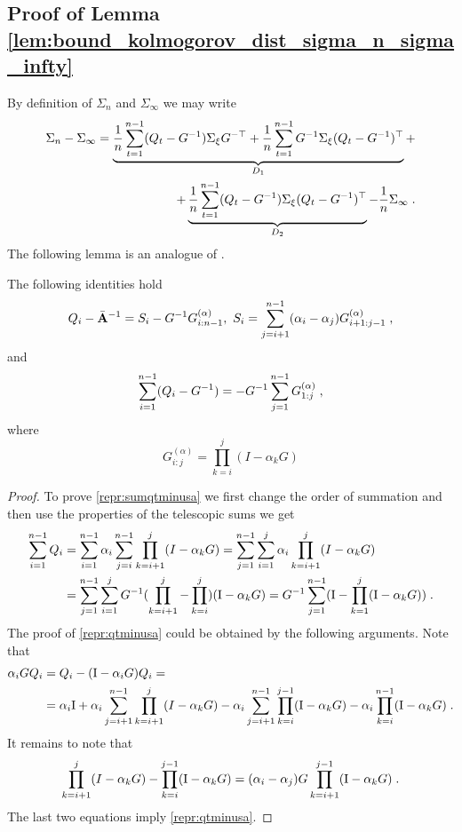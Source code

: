 \subsection{Proof of Lemma \ref{lem:bound_kolmogorov_dist_sigma_n_sigma_infty}}
\label{sec: proof of difference between cov}
By definition of $\Sigma_n$ and $\Sigma_\infty$ we may write
\begin{align}
    \label{repr:Lstar_minus_Ln}
    \Sigma_n - \Sigma_{\infty} = \underbrace{\frac{1}{n}\sum_{t=1}^{n-1} (Q_t - G^{-1})\Sigma_\xi G^{-\top} + \frac{1}{n} \sum_{t=1}^{n-1} G^{-1} \Sigma_\xi (Q_t - G^{-1})^\top}_{D_1} + \\ + \underbrace{\frac{1}{n} \sum_{t=1}^{n-1} (Q_t - G^{-1}) \Sigma_\xi (Q_t - G^{-1})^{\top}}_{D_2} - \frac{1}{n} \Sigma_{\infty} \;. 
\end{align}
The following lemma is an analogue of \citep[pp. 26-30]{wu2024statistical}. 

\begin{lemma} The following identities hold
\begin{equation}
    \label{repr:qtminusa}
    Q_i - \bar{\mathbf{A}}^{-1} = S_i - G^{-1} G_{i:n-1}^{(\alpha)} ,~ S_i = \sum_{j=i+1}^{n-1} (\alpha_i - \alpha_j) G_{i+1:j-1}^{(\alpha)} \;,  
\end{equation}
and
\begin{equation}
    \label{repr:sumqtminusa}
    \sum_{i=1}^{n-1} (Q_i - G^{-1}) = -G^{-1} \sum_{j=1}^{n-1} G_{1:j}^{(\alpha)} \;,
\end{equation}
where 
\begin{equation}
     G_{i:j}^{(\alpha)} = \prod_{k=i}^{j}(I-\alpha_kG)
\end{equation}
\end{lemma}

 \begin{proof}
To prove \eqref{repr:sumqtminusa} we first change the order of summation and then use the  properties of the telescopic sums we get
\begin{align}
\sum_{i=1}^{n-1} Q_i &= \sum_{i=1}^{n-1} \alpha_i \sum_{j=i}^{n-1}\prod_{k=i+1}^{j}(I-\alpha_k G) = \sum_{j=1}^{n-1} \sum_{i = 1}^j \alpha_i \prod_{k=i+1}^{j}(I-\alpha_k G) \\
& = \sum_{j=1}^{n-1} \sum_{i = 1}^j G^{-1} (\prod_{k = i+1}^{j} -  \prod_{k = i}^{j}) (\mathrm{I} - \alpha_k G)  = G^{-1} \sum_{j=1}^{n-1} (\mathrm{I} - \prod_{k = 1}^j (\mathrm{I} - \alpha_k G)) \;.
\end{align}
The proof of \eqref{repr:qtminusa} could be obtained by the following arguments. Note that
\begin{align}
\alpha_i G Q_i & = Q_i - (\mathrm{I} - \alpha_i G) Q_i = \\
& = \alpha_i \mathrm{I} + \alpha_i \sum_{j=i+1}^{n-1}\prod_{k=i+1}^{j}(I-\alpha_k G) - \alpha_i \sum_{j=i+1}^{n-1} \prod_{k=i}^{j-1}(\mathrm{I} - \alpha_k G) - \alpha_i \prod_{k=i}^{n-1} (\mathrm{I} - \alpha_k G)\;. 
\end{align}  
It remains to note that
$$
\prod_{k=i+1}^{j}(I-\alpha_k G) - \prod_{k=i}^{j-1}(\mathrm{I} - \alpha_k G) = (\alpha_i - \alpha_j) G \prod_{k=i+1}^{j-1} (\mathrm{I} - \alpha_k G) \;.
$$
The last two equations imply \eqref{repr:qtminusa}.
\end{proof}

